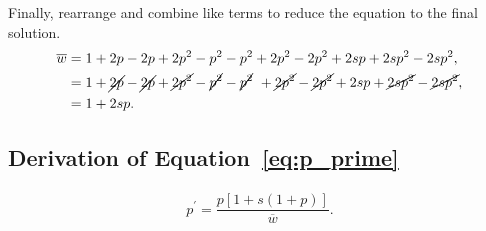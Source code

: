 \documentclass[letterpaper,nofonts]{tufte-handout}
\begin{document}
Finally, rearrange and combine like terms to reduce the equation to the final solution.
\begin{align*}
\overline{w} &= 1 + 2p - 2p + 2p^2 - p^2 - p^2 + 2p^2 - 2p^2 + 2sp + 2sp^2 - 2sp^2,\\
%
			 &= 1 + \cancel{2p} - \cancel{2p} + \cancel{2p^2} - \cancel{p^2} - \cancel{p^2} \ + \cancel{2p^2} - \cancel{2p^2} + 2sp + \cancel{2sp^2} - \cancel{2sp^2},\\
%
			 &= 1+2sp.
\end{align*}

\newpage

\subsection*{Derivation of Equation~\ref{eq:p_prime}}
%
\label{deriv:p_prime}

\begin{align*}
p^\prime = \dfrac{p[1 + s(1 + p)]}{\overline{w}}.
\end{align*}
\end{document}
